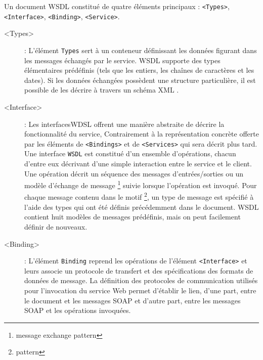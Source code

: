   Un document \textsc{WSDL} constitué de quatre éléments principaux
  \cite{chinnici2007web}: \texttt{<Types>}, \texttt{<Interface>},
  \texttt{<Binding>}, \texttt{<Service>}.

  \cite{baryannis2010} \cite{elie2010} \cite{lopez2008selection}

  \renewcommand{\descriptionlabel}[1]{\hspace{1.5cm}\texttt{#1}}
  \begin{description} %
    \item[<Types>]: L'élément \texttt{Types} sert à un conteneur
      définissant les données figurant dans les messages échangés par le
      service. \textsc{WSDL} supporte des types élémentaires prédéfinis
      (tels que les entiers, les chaînes de caractères et les dates). Si
      les données échangées possèdent une structure particulière, il est
      possible de les décrire à travers un schéma XML \cite{part20012}.
      
    \item[<Interface>]: Les interfaces\textsc{WDSL} offrent une
      manière abstraite de décrire la fonctionnalité du service,
      Contrairement à la représentation concrète offerte par les
      éléments de \texttt{<Bindings>} et de \texttt{<Services>} qui
      sera décrit plus tard.  Une interface \texttt{WSDL} est
      constitué d'un ensemble d'opérations, chacun d'entre eux
      décrivant d'une simple interaction entre le service et le
      client. Une opération décrit un séquence des messages
      d'entrées/sorties ou un modèle d'échange de message
      \footnote{message exchange pattern} suivie lorsque l'opération
      est invoqué. Pour chaque message contenu dans le motif
      \footnote{pattern}, un type de message est spécifié à l'aide des
      types qui ont été définis précédemment dans le document.
      \textsc{WSDL} contient huit modèles de messages prédéfinis, mais
      on peut facilement définir de nouveaux.

    \item[<Binding>]: \cite{elie2010} \cite{baryannis2010} L'élément
      \texttt{Binding} reprend les opérations de l'élément
      \texttt{<Interface>} et leurs associe un protocole de transfert
      et des spécifications des formats de données de message.  La
      définition des protocoles de communication utilisés pour
      l'invocation du service Web permet d'établir le lien, d'une
      part, entre le document et les messages \textsc{SOAP} et d'autre
      part, entre les messages \textsc{SOAP} et les opérations
      invoquées.


\end{description}
